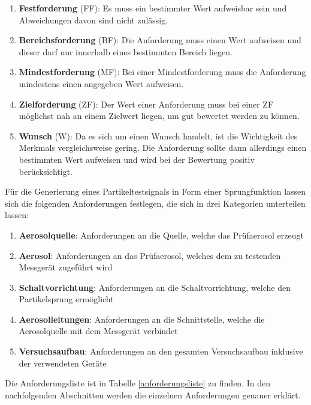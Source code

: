 \begin{enumerate}
	\item \textbf{Festforderung} (FF): Es muss ein bestimmter Wert aufweisbar sein und Abweichungen davon sind nicht zul\"{a}ssig.
	
	\item \textbf{Bereichsforderung} (BF): Die Anforderung muss einen Wert aufweisen und dieser darf nur innerhalb eines bestimmten Bereich liegen.
	
	\item \textbf{Mindestforderung} (MF): Bei einer Mindestforderung muss die Anforderung mindestens einen angegeben Wert aufweisen.
	
	\item \textbf{Zielforderung} (ZF): Der Wert einer Anforderung muss bei einer ZF m\"{o}glichst nah an einem Zielwert liegen, um gut bewertet werden zu k\"{o}nnen.
	
	\item \textbf{Wunsch} (W): Da es sich um einen Wunsch handelt, ist die Wichtigkeit des Merkmals vergleichsweise gering. Die Anforderung sollte dann allerdings einen bestimmten Wert aufweisen und wird bei der Bewertung positiv ber\"{u}cksichtigt. 
\end{enumerate}
F\"{u}r die Generierung eines Partikeltestsignals in Form einer Sprungfunktion lassen sich die folgenden Anforderungen festlegen, die sich in drei Kategorien unterteilen lassen:
\begin{enumerate}
	\item \textbf{Aerosolquelle}: Anforderungen an die Quelle, welche das Pr\"{u}faerosol erzeugt
	\item \textbf{Aerosol}: Anforderungen an das Pr\"{u}faerosol, welches dem zu testenden Messger\"{a}t zugef\"{u}hrt wird
	\item \textbf{Schaltvorrichtung}: Anforderungen an die Schaltvorrichtung, welche den Partikelsprung erm\"{o}glicht 
	\item \textbf{Aerosolleitungen}: Anforderungen an die Schnittstelle, welche die Aerosolquelle mit dem Messger\"{a}t verbindet
	\item \textbf{Versuchsaufbau}: Anforderungen an den gesamten Versuchsaufbau inklusive der verwendeten Ger\"{a}te
\end{enumerate}
Die Anforderungsliste ist in Tabelle \ref{anforderungsliste} zu finden. In den nachfolgenden Abschnitten werden die einzelnen Anforderungen genauer erkl\"{a}rt.

